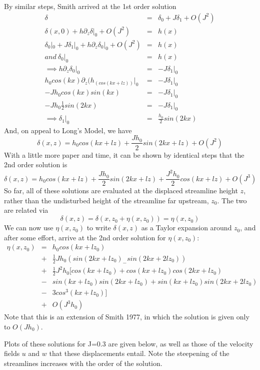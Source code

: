 \documentclass[12pt]{article}
\begin{document}
By similar steps, Smith arrived at the 1st order solution
\begin{eqnarray*}
	\delta &=& \delta_0 + J\delta_1 + O(J^2) \\
	\delta(x,0) + h \partial_z \delta |_0 +  O(J^2) &=& h(x)\\
	\delta_0|_0 + J\delta_1|_0+  h \partial_z \delta_0 |_0  +O(J^2)&=& h(x)\\
	and \   \delta_0|_0 &=& h(x) \\
	\implies h \partial_z \delta_0 |_0 &=& -J\delta_1|_0\\
	h_0 cos(kx) \partial_z(h_(cos(kx+lz))|_0&=& -J\delta_1|_0\\
	 -J h_0 cos(kx)sin(kx) &=& -J\delta_1|_0\\
	  -J h_0 \frac{1}{2}sin(2kx) &=& -J\delta_1|_0\\
	\implies \delta_1|_0 &=& \frac{h_0}{2}sin(2kx)
\end{eqnarray*}
And, on appeal to Long's Model, we have 
\[
\delta(x,z) = h_0cos(kx+lz) + \frac{J h_0}{2}sin(2kx+lz) + O(J^2)
\]
With a little more paper and time, it can be shown by identical steps that the 2nd order solution is  
\[
\delta(x,z) = h_0cos(kx+lz) + \frac{J h_0}{2}sin(2kx+lz) + \frac{J ^2h_0}{2}cos(kx+lz) + O(J^3)
\]
So far, all of these solutions are evaluated at the displaced streamline height $z$, rather than the undisturbed height of the streamline far upstream, $z_0$. The two are related via
\[
\delta(x,z) = \delta(x,z_0+\eta(x,z_0)) = \eta(x,z_0)
\]
We can now use $\eta(x,z_0)$ to write $\delta(x,z)$ as a Taylor expansion around $z_0$, and after some effort, arrive at the 2nd order solution for $\eta(x,z_0)$:
\begin{eqnarray*}
\eta(x,z_0) &=& h_0cos(kx+lz_0)\\
 &+&\frac{1}{2}Jh_0(sin(2kx+lz_0)_ - sin(2kx + 2lz_0))\\
 &+&\frac{1}{2}J^2h_0[cos(kx+lz_0)+cos(kx+lz_0)cos(2kx+lz_0)\\
 &-&sin(kx+lz_0)sin(2kx+lz_0)+sin(kx+lz_0)sin(2kx+2lz_0)\\
 &-&3cos^3(kx+lz_0)]\\
 &+& O(J^3h_0)
\end{eqnarray*}
Note that this is an extension of Smith 1977, in which the solution is given only to $O(Jh_0)$. 

Plots of these solutions for J=0.3 are given below, as well as those of the velocity fields $u$ and $w$ that these displacements entail. Note the steepening of the streamlines increases with the order of the solution. 
\end{document}
